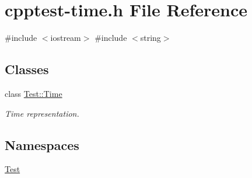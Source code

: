 \hypertarget{cpptest-time_8h}{}\section{cpptest-\/time.h File Reference}
\label{cpptest-time_8h}
{\ttfamily \#include $<$iostream$>$}\newline
{\ttfamily \#include $<$string$>$}\newline
\subsection*{Classes}
\begin{DoxyCompactItemize}
\item 
class \mbox{\hyperlink{class_test_1_1_time}{Test\+::\+Time}}
\begin{DoxyCompactList}\small\item\em Time representation. \end{DoxyCompactList}\end{DoxyCompactItemize}
\subsection*{Namespaces}
\begin{DoxyCompactItemize}
\item 
 \mbox{\hyperlink{namespace_test}{Test}}
\end{DoxyCompactItemize}
